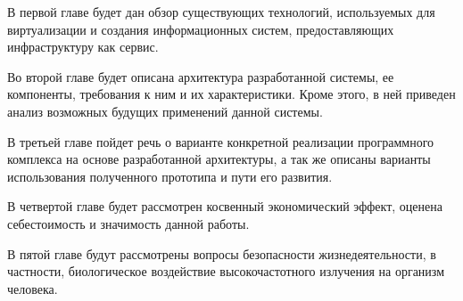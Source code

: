 В первой главе будет дан обзор существующих технологий, используемых для виртуализации
и создания информационных систем, предоставляющих инфраструктуру как сервис. 

Во второй главе будет описана архитектура разработанной системы, ее компоненты, требования
к ним и их характеристики. Кроме этого, в ней приведен анализ возможных будущих 
применений данной системы.

В третьей главе пойдет речь о варианте конкретной реализации программного комплекса на 
основе разработанной архитектуры, а так же описаны варианты использования полученного 
прототипа и пути его развития.

В четвертой главе будет рассмотрен косвенный экономический эффект, оценена
себестоимость и значимость данной работы.

В пятой главе будут рассмотрены вопросы безопасности жизнедеятельности, в частности,
биологическое воздействие высокочастотного излучения на организм человека.




